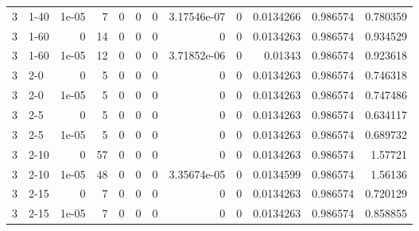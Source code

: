 \begin{tabular}{rlrrrrrrrrrr}
     3 & 1-40   &      1e-05 &           7 &                 0 &                 0 &     0           &     3.17546e-07 &      0           &        0.0134266 &               0.986574 &           0.780359 \\
     3 & 1-60   &      0     &          14 &                 0 &                 0 &     0           &     0           &      0           &        0.0134263 &               0.986574 &           0.934529 \\
     3 & 1-60   &      1e-05 &          12 &                 0 &                 0 &     0           &     3.71852e-06 &      0           &        0.01343   &               0.986574 &           0.923618 \\
     3 & 2-0    &      0     &           5 &                 0 &                 0 &     0           &     0           &      0           &        0.0134263 &               0.986574 &           0.746318 \\
     3 & 2-0    &      1e-05 &           5 &                 0 &                 0 &     0           &     0           &      0           &        0.0134263 &               0.986574 &           0.747486 \\
     3 & 2-5    &      0     &           5 &                 0 &                 0 &     0           &     0           &      0           &        0.0134263 &               0.986574 &           0.634117 \\
     3 & 2-5    &      1e-05 &           5 &                 0 &                 0 &     0           &     0           &      0           &        0.0134263 &               0.986574 &           0.689732 \\
     3 & 2-10   &      0     &          57 &                 0 &                 0 &     0           &     0           &      0           &        0.0134263 &               0.986574 &           1.57721  \\
     3 & 2-10   &      1e-05 &          48 &                 0 &                 0 &     0           &     3.35674e-05 &      0           &        0.0134599 &               0.986574 &           1.56136  \\
     3 & 2-15   &      0     &           7 &                 0 &                 0 &     0           &     0           &      0           &        0.0134263 &               0.986574 &           0.720129 \\
     3 & 2-15   &      1e-05 &           7 &                 0 &                 0 &     0           &     0           &      0           &        0.0134263 &               0.986574 &           0.858855 \\

\end{tabular}
